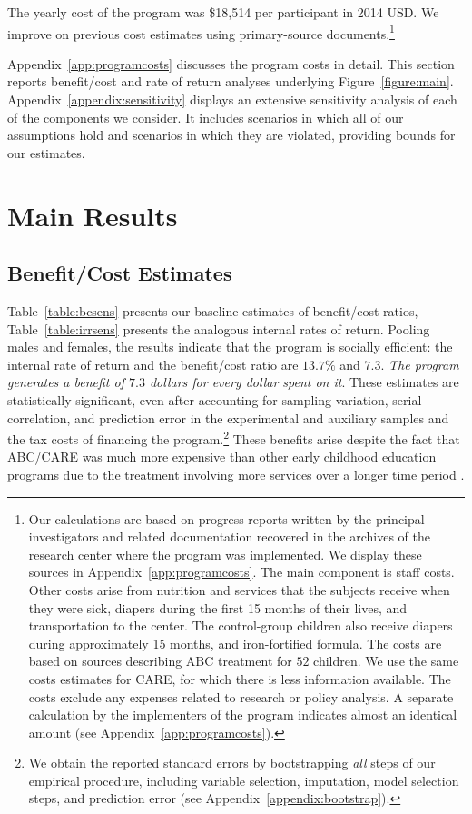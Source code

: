 The yearly cost of the program was \$18,514 per participant in 2014 USD. We improve on previous cost estimates using primary-source documents.\footnote{Our calculations are based on progress reports written by the principal investigators and related documentation recovered in the archives of the research center where the program was implemented. We display these sources in Appendix~\ref{app:programcosts}. The main component is staff costs. Other costs arise from nutrition and services that the subjects receive when they were sick, diapers during the first 15 months of their lives, and transportation to the center. The control-group children also receive diapers during approximately 15 months, and iron-fortified formula. The costs are based on sources describing ABC treatment for $52$ children. We use the same costs estimates for CARE, for which there is less information available. The costs exclude any expenses related to research or policy analysis. A separate calculation by the implementers of the program indicates almost an identical amount (see  Appendix~\ref{app:programcosts}).}

Appendix~\ref{app:programcosts} discusses the program costs in detail. This section reports benefit/cost and rate of return analyses underlying Figure~\ref{figure:main}.  Appendix~\ref{appendix:sensitivity} displays an extensive sensitivity analysis of each of the components we consider. It includes scenarios in which all of our assumptions hold and scenarios in which they are violated, providing bounds for our estimates.

\section{Main Results} \label{section:cbaresults}

\subsection{Benefit/Cost Estimates}

Table~\ref{table:bcsens} presents our baseline estimates of benefit/cost ratios, Table~\ref{table:irrsens} presents the analogous internal rates of return. Pooling males and females, the results indicate that the program is socially efficient: the internal rate of return and the benefit/cost ratio are $13.7\%$ and $7.3$. \textit{The program generates a benefit of $7.3$ dollars for every dollar spent on it}. These estimates are statistically significant, even after accounting for sampling variation, serial correlation, and prediction error in the experimental and auxiliary samples and the tax costs of financing the program.\footnote{We obtain the reported standard errors by bootstrapping \emph{all} steps of our empirical procedure, including variable selection, imputation, model selection steps, and prediction error (see  Appendix~\ref{appendix:bootstrap}).} These benefits arise despite the fact that ABC/CARE was much more expensive than other early childhood education programs due to the treatment involving more services over a longer time period \citep{Elango_Hojman_etal_2016_Early-Edu}.

